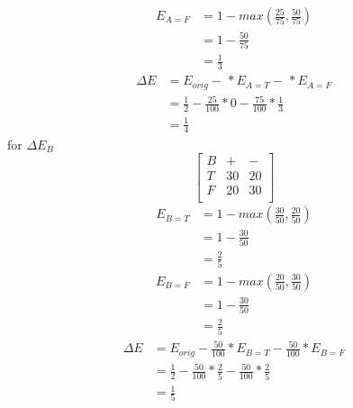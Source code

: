 \documentclass[12pt,english]{article}
\begin{document}
\begin{equation*}\tag{4}\label{eq:31}
\begin{split}
E_{A=F} &= 1 - max(\frac{25}{75},\frac{50}{75})\\
&=1 - \frac{50}{75}\\
&=\frac{1}{3}
\end{split}
\end{equation*}
\begin{equation*}\tag{5}\label{eq:32}
\begin{split}
\Delta E &= E_{orig} - \frac{}{} * E_{A=T} - \frac{}{} * E_{A=F}\\
&= \frac{1}{2} -\frac{25}{100} *0 - \frac{75}{100} *\frac{1}{3}\\
&= \frac{1}{4}
\end{split}
\end{equation*}
for $\Delta E_{B}$\\
\begin{equation*}\tag{6}\label{eq:33}
\begin{bmatrix} B & + & - \\T & 30 &  20 \\F & 20 & 30 \\ \end{bmatrix}
\end{equation*}
\begin{equation*}\tag{7}\label{eq:34}
\begin{split}
E_{B=T} &= 1 - max(\frac{30}{50},\frac{20}{50})\\
&=1 - \frac{30}{50}\\
&=\frac{2}{5}
\end{split}
\end{equation*}
\begin{equation*}\tag{8}\label{eq:35}
\begin{split}
E_{B=F} &= 1 - max(\frac{20}{50},\frac{30}{50})\\
&=1 - \frac{30}{50}\\
&=\frac{2}{5}
\end{split}
\end{equation*}
\begin{equation*}\tag{9}\label{eq:36}
\begin{split}
\Delta E &= E_{orig} - \frac{50}{100} * E_{B=T} - \frac{50}{100} * E_{B=F}\\
&= \frac{1}{2} -\frac{50}{100} *\frac{2}{5} - \frac{50}{100} *\frac{2}{5}\\
&= \frac{1}{5}
\end{split}
\end{equation*}
\end{document}
